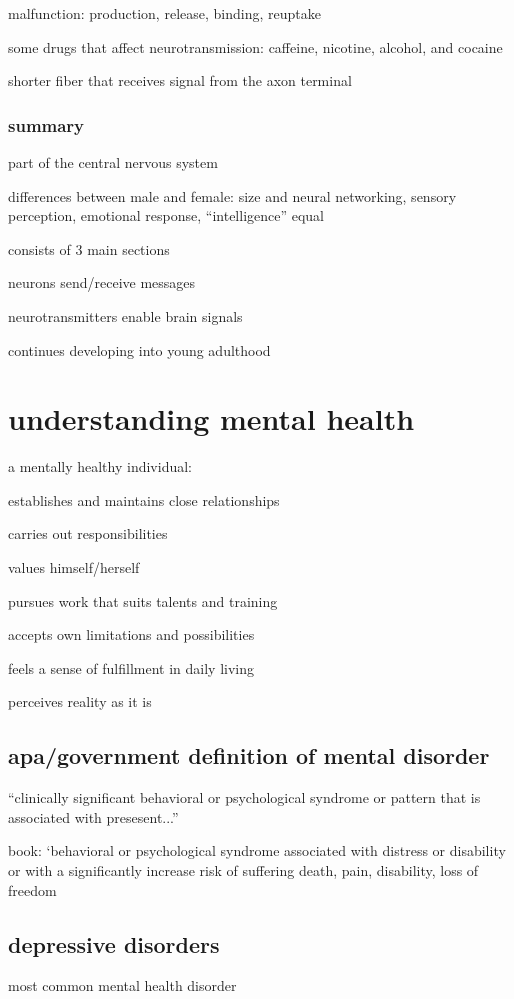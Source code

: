 \documentclass[letterpaper]{article}
\begin{document}
malfunction: production, release, binding, reuptake

some drugs that affect neurotransmission: caffeine, nicotine, alcohol, and cocaine

shorter fiber that receives signal from the axon terminal

\subsubsection*{summary}
part of the central nervous system

differences between male and female:
size and neural networking, sensory perception, emotional response, ``intelligence'' equal

consists of 3 main sections

neurons send/receive messages

neurotransmitters enable brain signals

continues developing into young adulthood

\section*{understanding mental health}
a mentally healthy individual:

establishes and maintains close relationships

carries out responsibilities

values himself/herself

pursues work that suits talents and training

accepts own limitations and possibilities

feels a sense of fulfillment in daily living

perceives reality as it is
\subsection*{apa/government definition of mental disorder}
``clinically significant behavioral or psychological syndrome or pattern that is associated with presesent...''

book: `behavioral or psychological syndrome associated with distress or disability or with a significantly increase risk of suffering death, pain, disability, loss of freedom


\subsection*{depressive disorders}
most common mental health disorder
\end{document}
